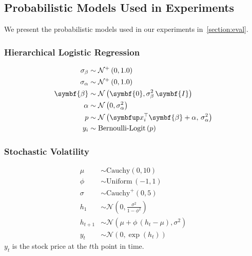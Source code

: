 
\subsection{Probabilistic Models Used in Experiments}
We present the probabilistic models used in our experiments in~\cref{section:eval}.

\subsubsection{Hierarchical Logistic Regression}
\begin{align*}
    \sigma_{\beta}  &\sim \mathcal{N}^+\left(0, 1.0\right) \\
    \sigma_{\alpha} &\sim \mathcal{N}^+\left(0, 1.0\right) \\
    \symbf{\beta} &\sim \mathcal{N}\left(\symbf{0}, \sigma_{\beta}^2\,\symbf{I}\right) \\
    \alpha        &\sim \mathcal{N}\left(0, \sigma_{\alpha}^2\right) \\
    p             &\sim \mathcal{N}\left(\vx_i^{\top}\symbf{\beta} + \alpha,\, \sigma_{\alpha}^2\right)\\
    y_i           &\sim \text{Bernoulli-Logit}\,(p)
\end{align*}

\subsubsection{Stochastic Volatility}
\begin{align*}
    \mu    &\sim \mathrm{Cauchy}(0, 10) \\
    \phi   &\sim \mathrm{Uniform}\,(-1, 1) \\
    \sigma &\sim \mathrm{Cauchy}^+(0, 5) \\
    h_1    &\sim \mathcal{N}\left( 0, \frac{\sigma^2}{1 - \phi^2} \right) \\
    h_{t+1} &\sim \mathcal{N}\left( \mu + \phi\,\left( h_{t} - \mu \right), \sigma^2 \right) \\
    y_t    &\sim \mathcal{N}\left( 0, \exp\left( h_{t} \right) \right)
\end{align*}
\(y_t\) is the stock price at the \(t\)th point in time.

